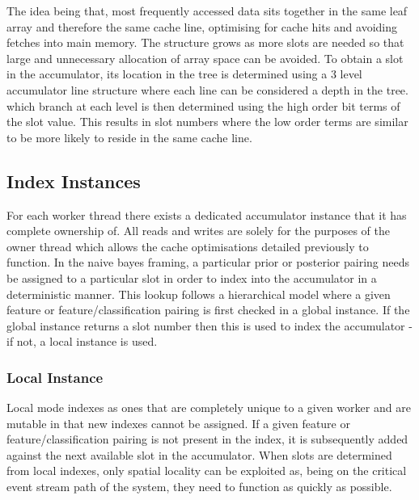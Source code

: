 \documentclass[a4paper,11pt]{scrreprt}
\begin{document}
The idea being that, most frequently accessed data sits together in the same leaf array and therefore the same cache line, optimising for cache hits and avoiding fetches into main memory. The structure grows as more slots are needed so that large and unnecessary allocation of array space can be avoided. To obtain a slot in the accumulator, its location in the tree is determined using a 3 level accumulator line structure where each line can be considered a depth in the tree. which branch at each level is then determined using the high order bit terms of the slot value. This results in slot numbers where the low order terms are similar to be more likely to reside in the same cache line.

\subsection{Index Instances}
For each worker thread there exists a dedicated accumulator instance that it has complete ownership of. All reads and writes are solely for the purposes of the owner thread which allows the cache optimisations detailed previously to function. In the naive bayes framing, a particular prior or posterior pairing needs be assigned to a particular slot in order to index into the accumulator in a deterministic manner. This lookup follows a hierarchical model where a given feature or feature/classification pairing is first checked in a global instance. If the global instance returns a slot number then this is used to index the accumulator - if not, a local instance is used.
\subsubsection{Local Instance}
Local mode indexes as ones that are completely unique to a given worker and are mutable in that new indexes cannot be assigned. If a given feature or feature/classification pairing is not present in the index, it is subsequently added against the next available slot in the accumulator. When slots are determined from local indexes, only spatial locality can be exploited as, being on the critical event stream path of the system, they need to function as quickly as possible.
\end{document}
